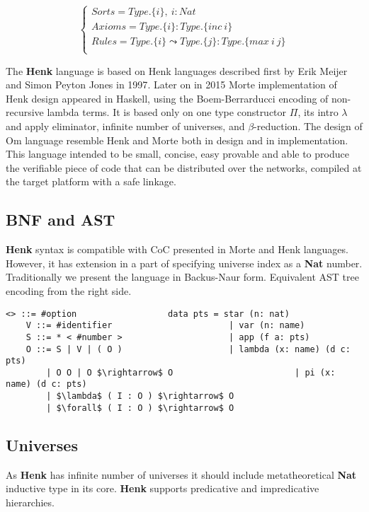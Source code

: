 \documentclass{article}
\begin{document}
$$
\begin{cases}
Sorts = Type.\{i\},\ i : Nat\\
Axioms = Type.\{i\} : Type.\{inc\ i\}\\
Rules = Type.\{i\} \leadsto Type.\{j\} : Type.\{max\ i\ j\}\\
\end{cases}
$$

The {\bf Henk} language is based on Henk languages described first by Erik Meijer and Simon Peyton Jones in 1997\cite{Erik97}.
Later on in 2015 Morte implementation of Henk design appeared in Haskell, using the Boem-Berrarducci encoding of non-recursive lambda terms.
It is based only on one type constructor {\bf $\Pi$}, its intro {\bf $\lambda$} and apply eliminator, infinite number of universes, and {\bf $\beta$}-reduction.
The design of Om language resemble Henk and Morte both in design and in implementation.
This language intended to be small, concise, easy provable and able to produce the verifiable piece of code that can be distributed over the networks, compiled at the target platform with a safe linkage.

\subsection{BNF and AST}

{\bf Henk} syntax is compatible with CoC presented in Morte and Henk languages.
However, it has extension in a part of specifying universe index as a {\bf Nat} number.
Traditionally we present the language in Backus-Naur form.
Equivalent AST tree encoding from the right side.

\begin{lstlisting}[mathescape=true]
   <> ::= #option                  data pts = star (n: nat)
    V ::= #identifier                       | var (n: name)
    S ::= * < #number >                     | app (f a: pts)
    O ::= S | V | ( O )                     | lambda (x: name) (d c: pts)
        | O O | O $\rightarrow$ O                        | pi (x: name) (d c: pts)
        | $\lambda$ ( I : O ) $\rightarrow$ O
        | $\forall$ ( I : O ) $\rightarrow$ O
\end{lstlisting}

\subsection{Universes}

As {\bf Henk} has infinite number of universes it should include metatheoretical {\bf Nat} inductive type in its core.
{\bf Henk} supports predicative and impredicative hierarchies.
\end{document}
